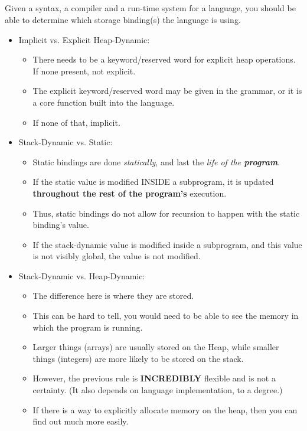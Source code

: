 \subsection{}
Given a syntax, a compiler and a run-time system for a language, you should be able to determine which storage binding(s) the language is using.

\begin{itemize}
\item Implicit vs. Explicit Heap-Dynamic:
  \begin{itemize}[noitemsep]
  \item There needs to be a keyword/reserved word for explicit heap operations. If none present, not explicit.
  \item The explicit keyword/reserved word may be given in the grammar, or it is a core function built into the language.
  \item If none of that, implicit.
  \end{itemize}

\item Stack-Dynamic vs. Static:
  \begin{itemize}[noitemsep]
  \item Static bindings are done \emph{statically}, and last the \emph{life of the \textbf{program}}.
  \item If the static value is modified INSIDE a subprogram, it is updated \textbf{throughout the rest of the program's} execution.
  \item Thus, static bindings do not allow for recursion to happen with the static binding's value.
  \item If the stack-dynamic value is modified inside a subprogram, and this value is not visibly global, the value is not modified.
  \end{itemize}

\item Stack-Dynamic vs. Heap-Dynamic:
  \begin{itemize}[noitemsep]
  \item The difference here is where they are stored.
  \item This can be hard to tell, you would need to be able to see the memory in which the program is running.
  \item Larger things (arrays) are usually stored on the Heap, while smaller things (integers) are more likely to be stored on the stack.
  \item However, the previous rule is \textbf{INCREDIBLY} flexible and is not a certainty. (It also depends on language implementation, to a degree.)
  \item If there is a way to explicitly allocate memory on the heap, then you can find out much more easily.
  \end{itemize}
\end{itemize}

